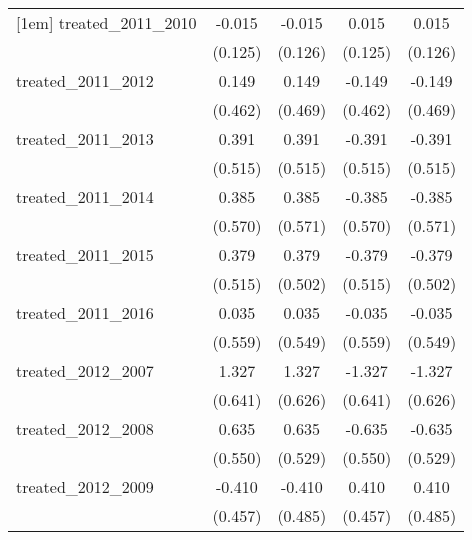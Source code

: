 {\begin{tabular}{l*{4}{c}}
[1em]
treated\_2011\_2010&      -0.015         &      -0.015         &       0.015         &       0.015         \\
            &     (0.125)         &     (0.126)         &     (0.125)         &     (0.126)         \\
[1em]
treated\_2011\_2012&       0.149         &       0.149         &      -0.149         &      -0.149         \\
            &     (0.462)         &     (0.469)         &     (0.462)         &     (0.469)         \\
[1em]
treated\_2011\_2013&       0.391         &       0.391         &      -0.391         &      -0.391         \\
            &     (0.515)         &     (0.515)         &     (0.515)         &     (0.515)         \\
[1em]
treated\_2011\_2014&       0.385         &       0.385         &      -0.385         &      -0.385         \\
            &     (0.570)         &     (0.571)         &     (0.570)         &     (0.571)         \\
[1em]
treated\_2011\_2015&       0.379         &       0.379         &      -0.379         &      -0.379         \\
            &     (0.515)         &     (0.502)         &     (0.515)         &     (0.502)         \\
[1em]
treated\_2011\_2016&       0.035         &       0.035         &      -0.035         &      -0.035         \\
            &     (0.559)         &     (0.549)         &     (0.559)         &     (0.549)         \\
[1em]
treated\_2012\_2007&       1.327\sym{*}  &       1.327\sym{*}  &      -1.327\sym{*}  &      -1.327\sym{*}  \\
            &     (0.641)         &     (0.626)         &     (0.641)         &     (0.626)         \\
[1em]
treated\_2012\_2008&       0.635         &       0.635         &      -0.635         &      -0.635         \\
            &     (0.550)         &     (0.529)         &     (0.550)         &     (0.529)         \\
[1em]
treated\_2012\_2009&      -0.410         &      -0.410         &       0.410         &       0.410         \\
            &     (0.457)         &     (0.485)         &     (0.457)         &     (0.485)         \\

\end{tabular}}
